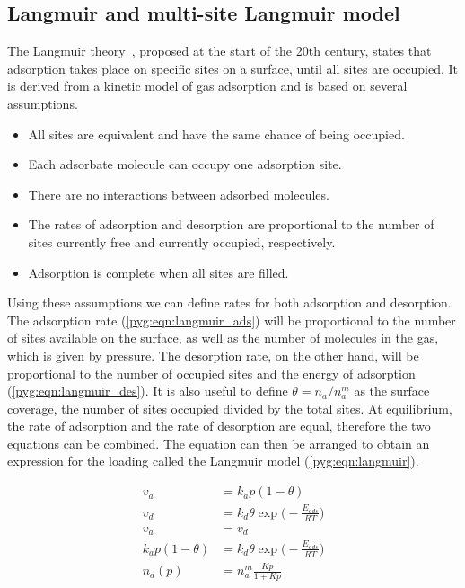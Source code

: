 \subsection{Langmuir and multi-site Langmuir
	model}\label{pyg:models:langmuir}

The Langmuir theory~\cite{langmuirAdsorptionGasesPlane1918},
proposed at the start of the 20th century, states that
adsorption takes place on specific sites on a surface, until
all sites are occupied.
It is derived from a kinetic model of gas adsorption and
is based on several assumptions.

\begin{itemize}

	\item All sites are equivalent and have the same chance of
	      being occupied.
	\item Each adsorbate molecule can occupy one adsorption site.
	\item There are no interactions between adsorbed molecules.
	\item The rates of adsorption and desorption are proportional
	      to the number of sites currently free and currently occupied,
	      respectively.
	\item Adsorption is complete when all sites are filled.

\end{itemize}

Using these assumptions we can define rates for both adsorption and
desorption. The adsorption rate (\autoref{pyg:eqn:langmuir_ads})
will be proportional to the number of sites available on the surface,
as well as the number of molecules in the gas, which is given by
pressure.
The desorption rate, on the other hand, will be proportional to the
number of occupied sites and the energy of adsorption
(\autoref{pyg:eqn:langmuir_des}).
It is also useful to define \(\theta = n_a/n_a^m\) as the surface
coverage,
the number of sites occupied divided by the total sites. At
equilibrium,
the rate of adsorption and the rate of
desorption are equal, therefore the two equations can be combined.
The equation can then be arranged to obtain an expression for the
loading called the Langmuir model (\autoref{pyg:eqn:langmuir}).

\begin{align}
	v_a                & = k_a p (1 - \theta) \label{pyg:eqn:langmuir_ads} \\
	v_d                & = k_d \theta \exp{\Big(-\frac{E_{ads}}{RT}\Big)}
	\label{pyg:eqn:langmuir_des}                                           \\
	v_a                & = v_d                                             \\
	k_a p (1 - \theta) & = k_d \theta \exp{\Big(-\frac{E_{ads}}{RT}\Big)}        \\
	n_a(p)             & = n_a^m \frac{Kp}{1+Kp} \label{pyg:eqn:langmuir}
\end{align}

